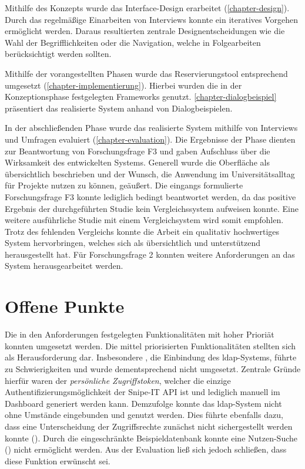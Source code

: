 Mithilfe des Konzepts wurde das Interface-Design erarbeitet
(\ref{chapter-design}). Durch das regelmäßige Einarbeiten von Interviews konnte
ein iteratives Vorgehen ermöglicht werden. Daraus resultierten zentrale
Designentscheidungen wie die Wahl der Begrifflichkeiten oder die Navigation, welche in
Folgearbeiten berücksichtigt werden sollten.

Mithilfe der vorangestellten Phasen wurde das Reservierungstool entsprechend
umgesetzt (\ref{chapter-implementierung}). Hierbei wurden die in der
Konzeptionsphase festgelegten Frameworks genutzt. \ref{chapter-dialogbeispiel}
präsentiert das realisierte System anhand von Dialogbeispielen.

In der abschließenden Phase wurde das realisierte System mithilfe von Interviews
und Umfragen evaluiert (\ref{chapter-evaluation}). Die Ergebnisse der Phase
dienten zur Beantwortung von Forschungsfrage F3 und gaben Aufschluss über die
Wirksamkeit des entwickelten Systems. Generell wurde die Oberfläche als
übersichtlich beschrieben und der Wunsch, die Anwendung im Universitätsalltag
für Projekte nutzen zu können, geäußert. Die eingangs formulierte
Forschungsfrage F3 konnte lediglich bedingt beantwortet werden, da das positive
Ergebnis der durchgeführten Studie kein Vergleichssystem aufweisen konnte. Eine
weitere ausführliche Studie mit einem Vergleichsystem wird somit empfohlen.
Trotz des fehlenden Vergleichs konnte die Arbeit ein qualitativ hochwertiges
System hervorbringen, welches sich als übersichtlich und unterstützend
herausgestellt hat. Für Forschungsfrage 2 konnten weitere Anforderungen an das
System herausgearbeitet werden.

\section{Offene Punkte}
\label{sec:punkte}
Die in den Anforderungen festgelegten Funktionalitäten mit hoher Prioriät
konnten umgesetzt werden. Die mittel priorisierten Funktionalitäten stellten
sich als Herausforderung dar. Insbesondere , die Einbindung des
\ac{ldap}-Systems, führte zu Schwierigkeiten und wurde dementsprechend nicht
umgesetzt. Zentrale Gründe hierfür waren der \textit{persönliche
    Zugriffstoken}, welcher die einzige Authentifizierungsmöglichkeit der Snipe-IT
API ist und lediglich manuell im Dashboard generiert werden kann. Demzufolge
konnte das \ac{ldap}-System nicht ohne Umstände eingebunden und genutzt
werden. Dies führte ebenfalls dazu, dass eine Unterscheidung der Zugriffsrechte
zunächst nicht sichergestellt werden konnte (). Durch die
eingeschränkte Beispieldatenbank konnte eine Nutzen-Suche () nicht
ermöglicht werden. Aus der Evaluation ließ sich jedoch schließen, dass diese
Funktion erwünscht sei.

